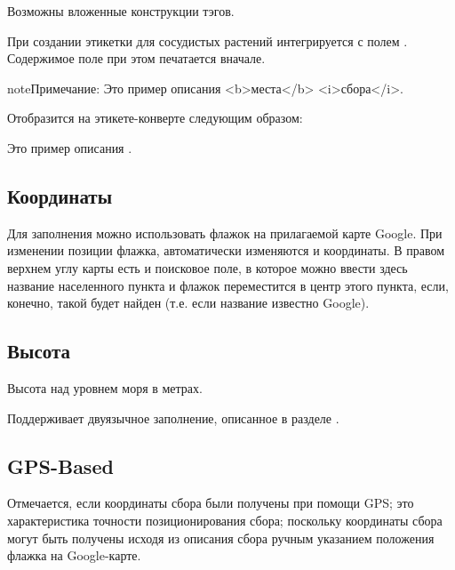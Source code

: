 \documentclass[letterpaper,10pt,russian]{sphinxmanual}
\begin{document}
Возможны вложенные конструкции тэгов.

При создании этикетки для сосудистых растений интегрируется с полем .
Содержимое поле {\hyperref[\detokenize{main:id25}]{}}  при этом печатается вначале.

\begin{sphinxadmonition}{note}{Примечание:}
Это пример описания \textless{}b\textgreater{}места\textless{}/b\textgreater{} \textless{}i\textgreater{}сбора\textless{}/i\textgreater{}.

Отобразится на этикете-конверте следующим образом:

Это пример описания  .
\end{sphinxadmonition}

\ignorespaces 

\subsection{Координаты}
\label{\detokenize{main:index-22}}\label{\detokenize{main:id27}}
Для заполнения можно использовать флажок на прилагаемой карте Google.
При изменении позиции флажка, автоматически изменяются и координаты.
В правом верхнем углу карты есть и поисковое поле, в которое можно ввести здесь
название населенного пункта и флажок переместится в центр этого пункта, если,
конечно, такой будет найден (т.е. если название известно Google).

\ignorespaces 

\subsection{Высота}
\label{\detokenize{main:id28}}\label{\detokenize{main:index-23}}
Высота над уровнем моря в метрах.

Поддерживает двуязычное заполнение, описанное в разделе {\hyperref[\detokenize{main:id14}]{}}.

\ignorespaces 

\subsection{GPS-Based}
\label{\detokenize{main:index-24}}\label{\detokenize{main:gps-based}}
Отмечается, если координаты сбора были получены при помощи GPS;
это характеристика точности позиционирования сбора; поскольку координаты
сбора могут быть получены исходя из описания сбора ручным указанием
положения флажка на Google-карте.
\end{document}
